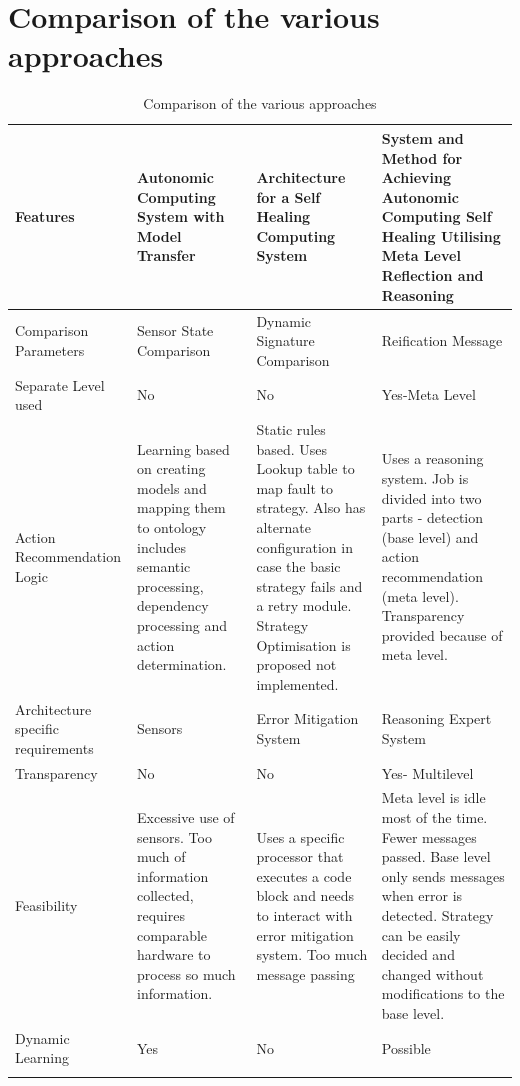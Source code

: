\section{Comparison of the various approaches}
\begin{center}
\small		
\begin{longtable}{| p{3cm} | p{3.5cm} | p{3.5cm} | p{3.5cm} |}
\hline 
\bf{Features} & \bf{Autonomic Computing System with Model Transfer } & \bf{Architecture for a Self Healing Computing System} & \bf{System and Method for Achieving Autonomic Computing Self Healing Utilising Meta Level Reflection and Reasoning}\\ \hline
{Comparison Parameters} & {Sensor State Comparison} & {Dynamic Signature Comparison} & {Reification Message} \\ \hline
{Separate Level used} & {No} & {No} & {Yes-Meta Level}\\ \hline
{Action Recommendation Logic} & {Learning based on creating models and mapping them to ontology includes semantic processing, dependency processing and action determination. } & {Static rules based. Uses Lookup table to map fault to strategy. Also has alternate configuration in case the basic strategy fails and a retry module. Strategy Optimisation is proposed not implemented.} & {Uses a reasoning system. Job is divided into two parts - detection (base level) and action recommendation (meta level). Transparency provided because of meta level.}\\ \hline
{Architecture specific requirements} & {Sensors} & {Error Mitigation System} & {Reasoning Expert System}\\ \hline
{Transparency} & {No} & {No} & {Yes- Multilevel}\\ \hline
{Feasibility} & {Excessive use of sensors. Too much of information collected, requires comparable hardware to process so much information.} & {Uses a specific processor that executes a code block and needs to interact with error mitigation system. Too much message passing} & {Meta level is idle most of the time. Fewer messages passed. Base level only sends messages when error is detected. Strategy can be easily decided and changed without modifications to the base level.}\\ \hline
{Dynamic Learning} & {Yes} & {No} & {Possible}\\ \hline
\caption{Comparison of the various approaches}
\end{longtable}
\label{table1}
\end{center}

